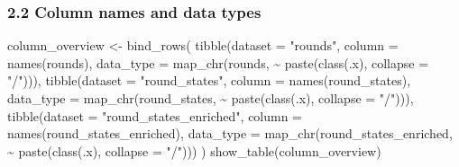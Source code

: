 \documentclass[
  letterpaper,
  DIV=11,
  numbers=noendperiod]{scrartcl}
\newenvironment{Shaded}{\begin{snugshade}}{\end{snugshade}}
\newcommand{\AttributeTok}[1]{\textcolor[rgb]{0.40,0.45,0.13}{#1}}
\newcommand{\FunctionTok}[1]{\textcolor[rgb]{0.28,0.35,0.67}{#1}}
\newcommand{\NormalTok}[1]{\textcolor[rgb]{0.00,0.23,0.31}{#1}}
\newcommand{\OtherTok}[1]{\textcolor[rgb]{0.00,0.23,0.31}{#1}}
\newcommand{\SpecialCharTok}[1]{\textcolor[rgb]{0.37,0.37,0.37}{#1}}
\newcommand{\StringTok}[1]{\textcolor[rgb]{0.13,0.47,0.30}{#1}}
\begin{document}
\subsubsection{2.2 Column names and data
types}\label{column-names-and-data-types}

\begin{Shaded}
\begin{Highlighting}[]
\NormalTok{column\_overview }\OtherTok{\textless{}{-}} \FunctionTok{bind\_rows}\NormalTok{(}
  \FunctionTok{tibble}\NormalTok{(}\AttributeTok{dataset =} \StringTok{"rounds"}\NormalTok{, }\AttributeTok{column =} \FunctionTok{names}\NormalTok{(rounds),}
         \AttributeTok{data\_type =} \FunctionTok{map\_chr}\NormalTok{(rounds, }\SpecialCharTok{\textasciitilde{}} \FunctionTok{paste}\NormalTok{(}\FunctionTok{class}\NormalTok{(.x), }\AttributeTok{collapse =} \StringTok{"/"}\NormalTok{))),}
  \FunctionTok{tibble}\NormalTok{(}\AttributeTok{dataset =} \StringTok{"round\_states"}\NormalTok{, }\AttributeTok{column =} \FunctionTok{names}\NormalTok{(round\_states),}
         \AttributeTok{data\_type =} \FunctionTok{map\_chr}\NormalTok{(round\_states, }\SpecialCharTok{\textasciitilde{}} \FunctionTok{paste}\NormalTok{(}\FunctionTok{class}\NormalTok{(.x), }\AttributeTok{collapse =} \StringTok{"/"}\NormalTok{))),}
  \FunctionTok{tibble}\NormalTok{(}\AttributeTok{dataset =} \StringTok{"round\_states\_enriched"}\NormalTok{, }\AttributeTok{column =} \FunctionTok{names}\NormalTok{(round\_states\_enriched),}
         \AttributeTok{data\_type =} \FunctionTok{map\_chr}\NormalTok{(round\_states\_enriched,}
                             \SpecialCharTok{\textasciitilde{}} \FunctionTok{paste}\NormalTok{(}\FunctionTok{class}\NormalTok{(.x), }\AttributeTok{collapse =} \StringTok{"/"}\NormalTok{)))}
\NormalTok{)}
\FunctionTok{show\_table}\NormalTok{(column\_overview)}
\end{Highlighting}
\end{Shaded}
\end{document}
